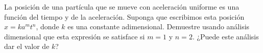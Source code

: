 \item La posición de una partícula que se mueve con aceleración uniforme es una función del tiempo y de la aceleración. Suponga que escribimos esta posición $x = k a^m t^n$, donde $k$ es una constante adimensional. Demuestre usando análisis dimensional que esta expresión se satisface si $m = 1$ y $n = 2$. ¿Puede este análisis dar el valor de $k$?
